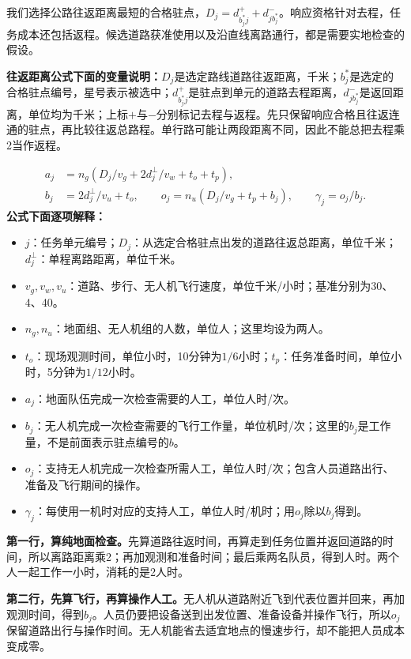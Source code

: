 \documentclass[12pt,a4paper]{article}
\numberwithin{equation}{section}
\begin{document}
我们选择公路往返距离最短的合格驻点，$D_j=d_{b_j^*j}^++d_{jb_j^*}^-$。响应资格针对去程，任务成本还包括返程。候选道路获准使用以及沿直线离路通行，都是需要实地检查的假设。

\noindent\textbf{往返距离公式下面的变量说明：}$D_j$是选定路线道路往返距离，千米；$b_j^*$是选定的合格驻点编号，星号表示被选中；$d_{b_j^*j}^{+}$是驻点到单元的道路去程距离，$d_{jb_j^*}^{-}$是返回距离，单位均为千米；上标$+$与$-$分别标记去程与返程。先只保留响应合格且往返连通的驻点，再比较往返总路程。单行路可能让两段距离不同，因此不能总把去程乘2当作返程。


\begin{equation}
\begin{aligned}
a_j&=n_g(D_j/v_g+2d_j^\perp/v_w+t_o+t_p),\\
b_j&=2d_j^\perp/v_u+t_o,\qquad
o_j=n_u(D_j/v_g+t_p+b_j),\qquad\gamma_j=o_j/b_j.
\end{aligned}
\label{eq:costs}
\end{equation}
\noindent\textbf{公式下面逐项解释：}
\begin{itemize}
\item $j$：任务单元编号；$D_j$：从选定合格驻点出发的道路往返总距离，单位千米；$d_j^{\perp}$：单程离路距离，单位千米。
\item $v_g,v_w,v_u$：道路、步行、无人机飞行速度，单位千米/小时；基准分别为30、4、40。
\item $n_g,n_u$：地面组、无人机组的人数，单位人；这里均设为两人。
\item $t_o$：现场观测时间，单位小时，10分钟为$1/6$小时；$t_p$：任务准备时间，单位小时，5分钟为$1/12$小时。
\item $a_j$：地面队伍完成一次检查需要的人工，单位人时/次。
\item $b_j$：无人机完成一次检查需要的飞行工作量，单位机时/次；这里的$b_j$是工作量，不是前面表示驻点编号的$b$。
\item $o_j$：支持无人机完成一次检查所需人工，单位人时/次；包含人员道路出行、准备及飞行期间的操作。
\item $\gamma_j$：每使用一机时对应的支持人工，单位人时/机时；用$o_j$除以$b_j$得到。
\end{itemize}
\noindent\textbf{第一行，算纯地面检查。}先算道路往返时间，再算走到任务位置并返回道路的时间，所以离路距离乘2；再加观测和准备时间；最后乘两名队员，得到人时。两个人一起工作一小时，消耗的是2人时。

\noindent\textbf{第二行，先算飞行，再算操作人工。}无人机从道路附近飞到代表位置并回来，再加观测时间，得到$b_j$。人员仍要把设备送到出发位置、准备设备并操作飞行，所以$o_j$保留道路出行与操作时间。无人机能省去适宜地点的慢速步行，却不能把人员成本变成零。
\end{document}
